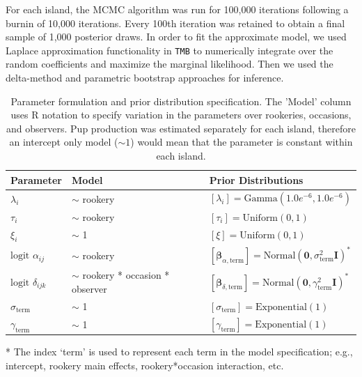 \documentclass[fleqn,10pt]{wlscirep}
\begin{document}
{For each island, the MCMC algorithm was run for 100,000 iterations following a burnin of 10,000 iterations. Every 100th iteration was retained to obtain a final sample of 1,000 posterior draws. In order to fit the approximate model, we used Laplace approximation functionality in \texttt{TMB} to numerically integrate over the random coefficients and maximize the marginal likelihood. Then we used the delta-method and parametric bootstrap approaches for inference.

\begin{table}

\caption{\label{tab:param}Parameter formulation and prior distribution specification. The 'Model' column uses R notation to specify variation in the parameters over rookeries, occasions, and observers. Pup production was estimated separately for each island, therefore an intercept only model ($\sim 1$) would mean that the parameter is constant within each island.}
\centering
\begin{threeparttable}
\begin{tabular}[t]{lll}
\toprule
Parameter & Model & Prior Distributions\\
\midrule
$\lambda_i$ & $\sim$ rookery & $[\lambda_i] = \text{Gamma}(1.0 e^{-6}, 1.0 e^{-6})$\\
$\tau_i$ & $\sim$ rookery & $[\tau_i] = \text{Uniform}(0, 1)$\\
$\xi_i$ & $\sim$ 1 & $[\xi] = \text{Uniform}(0, 1)$\\
$\text{logit }\alpha_{ij}$ & $\sim$ rookery & $[\boldsymbol{\beta}_{\alpha, \text{term}}] = \text{Normal}(\mathbf{0}, \sigma^2_{\text{term}}\mathbf{I})^{*}$\\
$\text{logit }\delta_{ijk}$ & $\sim$ rookery * occasion * observer & $[\boldsymbol{\beta}_{\delta, \text{term}}] = \text{Normal}(\mathbf{0}, \gamma^2_{\text{term}}\mathbf{I})^{*}$\\
\addlinespace
$\sigma_{\text{term}}$ & $\sim$ 1 & $[\sigma_{\text{term}}] = \text{Exponential}(1)$\\
$\gamma_{\text{term}}$ & $\sim$ 1 & $[\gamma_{\text{term}}] = \text{Exponential}(1)$\\
\bottomrule
\end{tabular}
\begin{tablenotes}
\item[*] The index `term' is used to represent each term in the model specification; e.g., intercept, rookery main effects, rookery*occasion interaction, etc.
\end{tablenotes}
\end{threeparttable}
\end{table}



}
\end{document}
